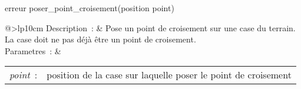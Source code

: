 \begin{minipage}{\linewidth}

\begin{lst-c++}
erreur poser_point_croisement(position point)
\end{lst-c++}

\noindent
\begin{tabular}[t]{@{\extracolsep{0pt}}>{\bfseries}lp{10cm}}
Description~: & Pose un point de croisement sur une case du terrain. La case doit ne pas déjà être un point de croisement. \\


Parametres~: &
\begin{tabular}[t]{@{\extracolsep{0pt}}ll}
    
    
      
        \textsl{point}~: & position de la case sur laquelle poser le point de croisement \\
      
    
  \end{tabular} \\






\end{tabular} \\[0.3cm]
\end{minipage}


